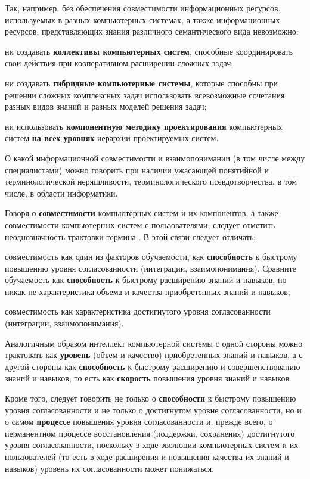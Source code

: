 Так, например, без обеспечения совместимости информационных ресурсов, используемых в разных компьютерных системах, а также информационных ресурсов, представляющих знания различного семантического вида невозможно:
\begin{textitemize}
	\item ни создавать \textbf{коллективы компьютерных систем}, способные координировать свои действия при кооперативном расширении сложных задач;
	\item ни создавать \textbf{гибридные компьютерные системы}, которые способны при решении сложных комплексных задач использовать всевозможные сочетания разных видов знаний и разных моделей решения задач;
	\item ни использовать \textbf{компонентную методику проектирования} компьютерных систем \textbf{на всех уровнях} иерархии проектируемых систем.
\end{textitemize}

О какой информационной совместимости и взаимопонимании (в том числе между специалистами) можно говорить при наличии ужасающей понятийной и терминологической неряшливости, терминологического псевдотворчества, в том числе, в области информатики.

Говоря о \textbf{совместимости} компьютерных систем и их компонентов, а также совместимости компьютерных систем с пользователями, следует отметить неоднозначность трактовки термина . В этой связи следует отличать:
\begin{textitemize}
    \item совместимость как один из факторов обучаемости, как \textbf{способность} к быстрому повышению уровня согласованности (интеграции, взаимопонимания).
    Сравните обучаемость как \textbf{способность} к быстрому расширению знаний и навыков, но никак не характеристика объема и качества приобретенных знаний и навыков;
    \item совместимость как характеристика достигнутого уровня согласованности (интеграции, взаимопонимания).
\end{textitemize}

Аналогичным образом интеллект компьютерной системы с одной стороны можно трактовать как \textbf{уровень} (объем и качество) приобретенных знаний и навыков, а с другой стороны как \textbf{способность} к быстрому расширению и совершенствованию знаний и навыков, то есть как \textbf{скорость} повышения уровня знаний и навыков.

Кроме того, следует говорить не только о \textbf{способности} к быстрому повышению уровня согласованности и не только о достигнутом уровне согласованности, но и о самом \textbf{процессе} повышения уровня согласованности и, прежде всего, о перманентном процессе восстановления (поддержки, сохранения) достигнутого уровня согласованности, поскольку в ходе эволюции компьютерных систем и их пользователей (то есть в ходе расширения и повышения качества их знаний и навыков) уровень их согласованности может понижаться.

